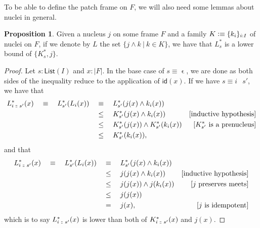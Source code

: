 \documentclass[a4paper, 11pt]{article}
\theoremstyle{definition}
\newtheorem{prop}{Proposition}
\newcommand{\is}{\vcentcolon\equiv}
\DeclareMathOperator{\emptyl}{\epsilon}
\DeclareMathOperator{\cons}{\colon\kern-1.1ex\colon\kern-0.4ex}
\DeclareMathOperator{\append}{\,}
\begin{document}
To be able to define the patch frame on $F$, we will also need some lemmas about nuclei in general.

\begin{prop}
  Given a nucleus $j$ on some frame $F$ and a family $K \is \{ k_i \}_{i : I}$ of nuclei on $F$, if
  we denote by $L$ the set $\{ j \wedge k ~|~ k \in K \}$, we have that $L^*_{s}$ is a lower bound of
  $\{ K^*_{s}, j \}$.
\end{prop}
\begin{proof}
  Let $s : \mathsf{List}(I)$ and $x : | F |$. In the base case of $s \equiv \emptyl$, we are done
  as both sides of the inequality reduce to the application of $\mathsf{id}(x)$. If we have
  $s \equiv i \append s'$, we have that
  \begin{align*}
    L^*_{i \cons s'}(x)
      \quad\equiv\quad L^*_{s'}(L_i(x))
     &\quad\equiv\quad L^*_{s'}(j(x) \wedge k_i(x)) \\
     &\quad\le\quad K^*_{s'}(j(x) \wedge k_i(x)) & [\text{inductive hypothesis}] \\
     &\quad\le\quad K^*_{s'}(j(x)) \wedge K^*_{s'}(k_i(x)) & [K^*_{s'}\ \text{is a prenucleus}] \\
     &\quad\le\quad K^*_{s'}(k_i(x)),
  \end{align*}
  and that
  \begin{align*}
    L^*_{i \cons s'}(x)
    \quad\equiv\quad L^*_{s'}(L_i(x)) 
    &\quad\equiv\quad L^*_{s'}(j(x) \wedge k_i(x)) & \\
    &\quad\le\quad j(j(x) \wedge k_i(x)) & [\text{inductive hypothesis}] \\
    &\quad\le\quad j(j(x)) \wedge j(k_i(x)) & [\text{$j$ preserves meets}]\\
    &\quad\le\quad j(j(x)) & \\
    &\quad=\quad j(x), & [\text{$j$ is idempotent}]
  \end{align*}
  which is to say $L^*_{i \cons s'}(x)$ is lower than both of $K^*_{i \cons s'}(x)$ and $j(x)$.
\end{proof}
\end{document}
